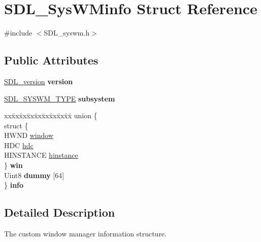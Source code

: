 \hypertarget{struct_s_d_l___sys_w_minfo}{}\section{S\+D\+L\+\_\+\+Sys\+W\+Minfo Struct Reference}
\label{struct_s_d_l___sys_w_minfo}


{\ttfamily \#include $<$S\+D\+L\+\_\+syswm.\+h$>$}

\subsection*{Public Attributes}
\begin{DoxyCompactItemize}
\item 
\mbox{\label{struct_s_d_l___sys_w_minfo_ac3a70af022d4849e9ff546595e94627f}} 
\mbox{\hyperlink{struct_s_d_l__version}{S\+D\+L\+\_\+version}} {\bfseries version}
\item 
\mbox{\label{struct_s_d_l___sys_w_minfo_a438b6a06ab3ee417293c7b7fc5a23855}} 
\mbox{\hyperlink{_s_d_l__syswm_8h_a064c26598287280fff2a00d6758ac4f7}{S\+D\+L\+\_\+\+S\+Y\+S\+W\+M\+\_\+\+T\+Y\+PE}} {\bfseries subsystem}
\item 
\mbox{\label{struct_s_d_l___sys_w_minfo_a6f656bd99593cb04d786095b364e9ede}} 
\begin{tabbing}
xx\=xx\=xx\=xx\=xx\=xx\=xx\=xx\=xx\=\kill
union \{\\
\>struct \{\\
\>\>HWND \mbox{\hyperlink{struct_s_d_l___sys_w_minfo_af06225591ff07e837bbd037728a525b9}{window}}\\
\>\>HDC \mbox{\hyperlink{struct_s_d_l___sys_w_minfo_a5c9d0745b083422834681e99c38b803e}{hdc}}\\
\>\>HINSTANCE \mbox{\hyperlink{struct_s_d_l___sys_w_minfo_ae3e93d21e2b20b2069f5f7d5308194f1}{hinstance}}\\
\>\} {\bfseries win}\\
\>Uint8 {\bfseries dummy} \mbox{[}64\mbox{]}\\
\} {\bfseries info}\\

\end{tabbing}\end{DoxyCompactItemize}


\subsection{Detailed Description}
The custom window manager information structure.

